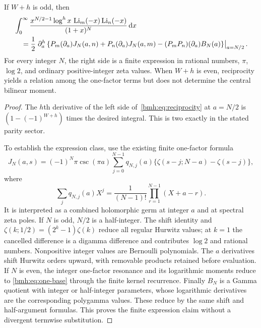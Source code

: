\begin{theorem}
\label{bmh:thm:central}
If $W+h$ is odd, then
\begin{align}
 &\int_0^\infty\frac{x^{N/2-1}\log^h x\,
                    \operatorname{Li}_m(-x)\operatorname{Li}_n(-x)}{(1+x)^N}\,\mathrm d x\notag\\
 &\quad=\frac12\left.\partial_a^h
 \left\{P_m(\partial_a)J_N(a,n)+P_n(\partial_a)J_N(a,m)
 -(P_mP_n)(\partial_a)B_N(a)\right\}\right|_{a=N/2}.
 \label{bmh:eq:central}
\end{align}
For every integer $N$, the right side is a finite expression in rational
numbers, $\pi$, $\log2$, and ordinary positive-integer zeta values.
When $W+h$ is even, reciprocity yields a relation among the one-factor
terms but does not determine the central bilinear moment.
\end{theorem}
\begin{proof}
The $h$th derivative of the left side of~\eqref{bmh:eq:reciprocity} at
$a=N/2$ is $(1-(-1)^{W+h})$ times the desired integral. This is two
exactly in the stated parity sector.

To establish the expression class, use the existing finite one-factor
formula~\cite{MLD}
\begin{equation}\label{bmh:eq:priorJN}
 J_N(a,s)=(-1)^N\pi\csc(\pi a)
       \sum_{j=0}^{N-1}q_{N,j}(a)
              \{\zeta(s-j;N-a)-\zeta(s-j)\},
\end{equation}
where
\[
 \sum_jq_{N,j}(a)X^j=
   \frac1{(N-1)!}\prod_{r=1}^{N-1}(X+a-r).
\]
It is interpreted as a combined holomorphic germ at integer $a$ and at
spectral zeta poles. If $N$ is odd, $N/2$ is a half-integer. The shift
identity and
$\zeta(k;1/2)=(2^k-1)\zeta(k)$ reduce all regular Hurwitz values;
at $k=1$ the cancelled difference is a digamma difference and contributes
$\log2$ and rational numbers. Nonpositive integer values are Bernoulli
polynomials. The $a$ derivatives shift Hurwitz orders upward, with
removable products retained before evaluation. If $N$ is even, the
integer one-factor resonance and its logarithmic moments reduce to
\eqref{bmh:eq:one-base} through the finite kernel recurrence. Finally
$B_N$ is a Gamma quotient with integer or half-integer parameters, whose
logarithmic derivatives are the corresponding polygamma values. These
reduce by the same shift and half-argument formulas. This proves the
finite expression claim without a divergent termwise substitution.
\end{proof}

